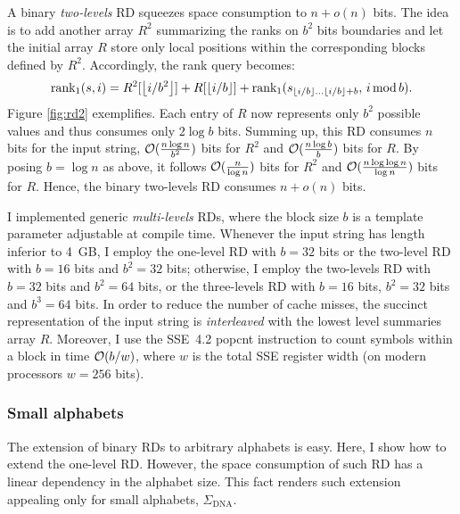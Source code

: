 A binary \emph{two-levels} RD squeezes space consumption to $n+o(n)$ bits.
The idea is to add another array $R^2$ summarizing the ranks on $b^2$ bits boundaries and let the initial array $R$ store only local positions within the corresponding blocks defined by $R^2$.
Accordingly, the rank query becomes:
\begin{eqnarray}
\rank_1(s,i) = R^2[\xfloor{i/b^2}] + R[\xfloor{i/b}] + \rank_1(s_{\xfloor{i/b} \dots \xfloor{i/b}+b}, \, i \imod{b}).
\end{eqnarray}
Figure \ref{fig:rd2} exemplifies.
Each entry of $R$ now represents only $b^2$ possible values and thus consumes only $2\log{b}$ bits.
Summing up, this RD consumes $n$ bits for the input string, $\mathcal{O}(\frac{n \log{n}}{b^2})$ bits for $R^2$ and $\mathcal{O}(\frac{n \log{b}}{b})$ bits for $R$.
By posing $b=\log{n}$ as above, it follows $\mathcal{O}(\frac{n}{\log{n}})$ bits for $R^2$ and $\mathcal{O}(\frac{n \log{\log{n}}}{\log{n}})$ bits for $R$.
Hence, the binary two-levels RD consumes $n + o(n)$ bits.

I implemented generic \emph{multi-levels} RDs, where the block size $b$ is a template parameter adjustable at compile time.
Whenever the input string has length inferior to 4~GB, I employ the one-level RD with $b = 32$ bits or the two-level RD with $b = 16$ bits and $b^2 = 32$ bits;
otherwise, I employ the two-levels RD with $b = 32$ bits and $b^2 = 64$ bits, or the three-levels RD with $b = 16$ bits, $b^2 = 32$ bits and $b^3 = 64$ bits.
In order to reduce the number of cache misses, the succinct representation of the input string is \emph{interleaved} with the lowest level summaries array $R$.
Moreover, I use the SSE~4.2 popcnt instruction \citep{Intel2011} to count symbols within a block in time $\mathcal{O}(b/w)$, where $w$ is the total SSE register width (on modern processors $w=256$ bits).

\subsubsection{Small alphabets}

The extension of binary RDs to arbitrary alphabets is easy.
Here, I show how to extend the one-level RD.
However, the space consumption of such RD has a linear dependency in the alphabet size.
This fact renders such extension appealing only for small alphabets, \eg $\Sigma_{\text{DNA}}$.

